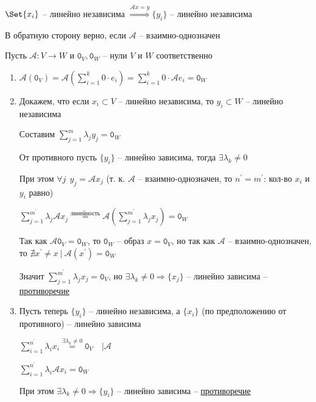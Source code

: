 \documentclass[12pt]{article}
\begin{document}
    \begin{MyTheorem}
        \Ths $\Set{x_i}$ -- линейно независима $\stackrel{\mathcal{A}x = y}{\Longrightarrow} \{y_i\}$ -- линейно независима

        В обратную сторону верно, если $\mathcal{A}$ -- взаимно-однозначен
    \end{MyTheorem}

    \begin{MyProof}
        Пусть $\mathcal{A} : V \rightarrow W$ и $\texttt{0}_V, \texttt{0}_W$ -- нули $V$ и $W$ соответственно

        \begin{enumerate}
            \item $\mathcal{A}(\texttt{0}_V) = \mathcal{A}\left(\sum^k_{i=1} 0 \cdot e_i\right) = \sum^k_{i=1} 0 \cdot \mathcal{A}e_i = \texttt{0}_W$

            \item Докажем, что если ${x_i} \subset V$ -- линейно независима, то ${y_i} \subset W$ -- линейно независима

            Составим $\sum^m_{j=1} \lambda_j y_j = \texttt{0}_W$ 
            
            От противного пусть $\{y_i\}$ -- линейно зависима, тогда $\exists \lambda_k \neq 0$

            При этом $\forall j \ \ y_j = \mathcal{A}x_j$ (т. к. $\mathcal{A}$ -- взаимно-однозначен, 
            то $n^\prime = m^\prime$: кол-во $x_i$ и $y_i$ равно)

            $\sum^{m^\prime}_{j=1} \lambda_j \mathcal{A}x_j \stackrel{\text{линейность}}{=} \mathcal{A} (\sum^{m^\prime}_{j=1} \lambda_j x_j) = \texttt{0}_W$

            Так как $\mathcal{A}\texttt{0}_V = \texttt{0}_W$, то $\texttt{0}_W$ -- образ $x = \texttt{0}_V$, 
            но так как $\mathcal{A}$ -- взаимно-однозначен, то
            $\nexists x^\prime \neq x \ | \ \mathcal{A}(x^\prime) = \texttt{0}_W$

            Значит $\sum^{m^\prime}_{j=1} \lambda_j x_j = \texttt{0}_V$, но 
            $\exists \lambda_k \neq 0 \Longrightarrow \{x_j\}$ -- линейно зависима -- \underline{противоречие}

            \item Пусть теперь $\{y_i\}$ -- линейно независима, а $\{x_i\}$ (по предположению от противного) -- линейно зависима

            $\sum^{n^\prime}_{i = 1} \lambda_i x_i \stackrel{\exists \lambda_k \neq 0}{=} \texttt{0}_V \quad \Big| \mathcal{A}$

            $\sum^{n^\prime}_{i = 1} \lambda_i \mathcal{A}x_i = \texttt{0}_W$

            При этом $\exists \lambda_k \neq 0 \Longrightarrow \{y_i\}$ -- линейно зависима -- \underline{противоречие}

        \end{enumerate}
    \end{MyProof}
\end{document}
